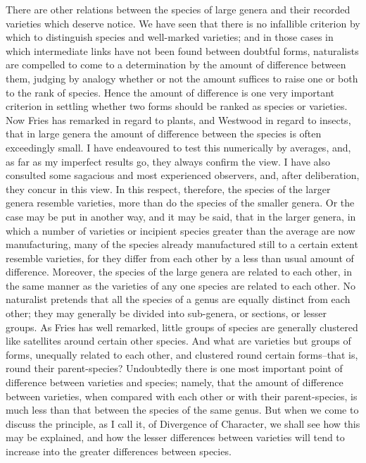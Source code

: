 There are other relations between the species of large genera and their recorded varieties which deserve notice. We have seen that there is no infallible criterion by which to distinguish species and well-marked varieties; and in those cases in which intermediate links have not been found between doubtful forms, naturalists are compelled to come to a determination by the amount of difference between them, judging by analogy whether or not the amount suffices to raise one or both to the rank of species. Hence the amount of difference is one very important criterion in settling whether two forms should be ranked as species or varieties. Now Fries has remarked in regard to plants, and Westwood in regard to insects, that in large genera the amount of difference between the species is often exceedingly small. I have endeavoured to test this numerically by averages, and, as far as my imperfect results go, they always confirm the view. I have also consulted some sagacious and most experienced observers, and, after deliberation, they concur in this view. In this respect, therefore, the species of the larger genera resemble varieties, more than do the species of the smaller genera. Or the case may be put in another way, and it may be said, that in the larger genera, in which a number of varieties or incipient species greater than the average are now manufacturing, many of the species already manufactured still to a certain extent resemble varieties, for they differ from each other by a less than usual amount of difference.
Moreover, the species of the large genera are related to each other, in the same manner as the varieties of any one species are related to each other. No naturalist pretends that all the species of a genus are equally distinct from each other; they may generally be divided into sub-genera, or sections, or lesser groups. As Fries has well remarked, little groups of species are generally clustered like satellites around certain other species. And what are varieties but groups of forms, unequally related to each other, and clustered round certain forms--that is, round their parent-species? Undoubtedly there is one most important point of difference between varieties and species; namely, that the amount of difference between varieties, when compared with each other or with their parent-species, is much less than that between the species of the same genus. But when we come to discuss the principle, as I call it, of Divergence of Character, we shall see how this may be explained, and how the lesser differences between varieties will tend to increase into the greater differences between species.
